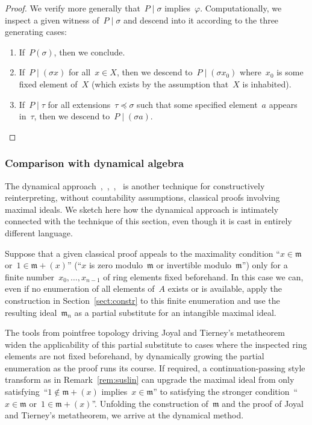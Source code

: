 \documentclass[com,11pt,crcready]{iosart2x}
\theoremstyle{definition}
\theoremstyle{plain}
\theoremstyle{remark}
\newcommand{\?}{\,{:}\,}
\newcommand{\mmm}{\mathfrak{m}}
\renewcommand{\_}{\mathpunct{.}\,}
\begin{document}
\begin{proof}We verify more generally that~$P \mid \sigma$ implies~$\varphi$.
Computationally, we inspect a given witness of~$P \mid \sigma$ and descend into
it according to the three generating cases:
\begin{enumerate}
\item If~$P(\sigma)$, then we conclude.
\item
If~$P \mid (\sigma x)$ for all~$x \in X$, then we descend to~$P \mid
(\sigma x_0)$ where~$x_0$ is some fixed element of~$X$ (which exists by
the assumption that~$X$ is inhabited).
\item If~$P \mid \tau$ for all
extensions~$\tau \preceq \sigma$ such that some specified element~$a$ appears
in~$\tau$, then we descend to~$P \mid (\sigma a)$.
\end{enumerate}
\end{proof}


\subsubsection{Comparison with dynamical algebra}

The dynamical approach~\cite[Section~XV.6]{lombardi-quitte:constructive-algebra},~\cite{coquand-lombardi-roy:dynamicalmethod},~\cite{yengui:constructive},~\cite{duval:about}
is another technique for constructively reinterpreting,
without countability assumptions, classical proofs involving maximal ideals.
We sketch here how the dynamical approach is intimately connected with the
technique of this section, even though it is cast in entirely different
language.

Suppose that a given classical proof appeals to the maximality condition ``$x \in \mmm$
or~$1 \in \mmm + (x)$'' (``$x$ is zero modulo~$\mmm$ or invertible
modulo~$\mmm$'') only for a finite number~$x_0,\ldots,x_{n-1}$ of ring elements
fixed beforehand. In this case we can, even if no enumeration of all elements
of~$A$ exists or is available, apply the construction in Section~\ref{sect:constr} to
this finite enumeration and use the resulting ideal~$\mmm_n$ as a partial
substitute for an intangible maximal ideal.

The tools from pointfree topology
driving Joyal and Tierney's metatheorem widen the applicability of this partial
substitute to cases where the inspected ring elements are
not fixed beforehand, by dynamically growing the partial enumeration as the
proof runs its course. If required, a continuation-passing style transform as
in Remark~\ref{rem:suslin} can upgrade the maximal ideal from only
satisfying~``$1 \not\in \mmm + (x)$ implies~$x \in
\mmm$'' to satisfying the stronger condition~``$x \in \mmm$ or~$1 \in \mmm
+ (x)$''.
%
Unfolding the construction of~$\mmm$ and the proof of Joyal
and Tierney's metatheorem, we arrive at the dynamical method.
\end{document}

